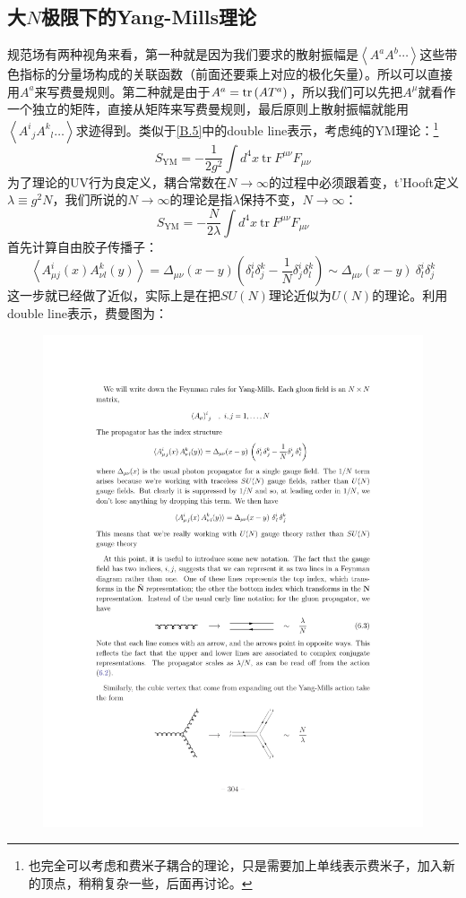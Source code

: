 \subsection{大$N$极限下的Yang-Mills理论}
规范场有两种视角来看，第一种就是因为我们要求的散射振幅是$\left<A^aA^b\cdots\right>$这些带色指标的分量场构成的关联函数（前面还要乘上对应的极化矢量）。所以可以直接用$A^a$来写费曼规则。第二种就是由于$A^a=\tr \left(A T^a\right)$，所以我们可以先把$A^\mu$就看作一个独立的矩阵，直接从矩阵来写费曼规则，最后原则上散射振幅就能用$\left<{A^{i}}_j{A^{k}}_l\ldots\right>$求迹得到。类似于\ref{B.5}中的double line表示，考虑纯的YM理论：\footnote{也完全可以考虑和费米子耦合的理论，只是需要加上单线表示费米子，加入新的顶点，稍稍复杂一些，后面再讨论。}
\begin{equation}
	S_\mathrm{YM}=-\frac1{2g^2}\int d^4x\mathrm{~tr~}F^{\mu\nu}F_{\mu\nu}
\end{equation}
为了理论的UV行为良定义，耦合常数在$N\to\infty$的过程中必须跟着变，t'Hooft定义$\lambda\equiv g^2N$，我们所说的$N\to\infty$的理论是指$\lambda$保持不变，$N\to\infty$：
\begin{equation}
	S_\mathrm{YM}=-\frac N{2\lambda}\int d^4x\mathrm{~tr~}F^{\mu\nu}F_{\mu\nu}
\end{equation}
首先计算自由胶子传播子：
\begin{equation}
	\left<A_{\mu j}^i(x)A_{\nu l}^k(y)\right>=\Delta_{\mu\nu}(x-y)\left(\delta_l^i\delta_j^k-\frac1N\delta_j^i\delta_l^k\right)\sim \Delta_{\mu\nu}(x-y)\mathrm{~}\delta_l^i\delta_j^k
\end{equation}
这一步就已经做了近似，实际上是在把$SU(N)$理论近似为$U(N)$的理论。利用double line表示，费曼图为：
\begin{figure}[H]
	\centering
	\includegraphics{figs/fig14.pdf}
\end{figure}
